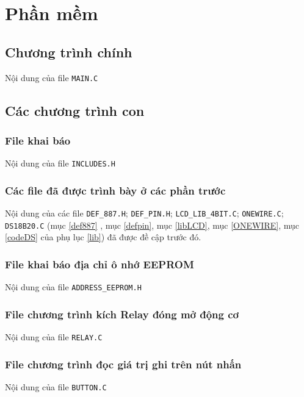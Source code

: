 \chapter{Phần mềm}
\section{Chương trình chính}
\hspace{.6cm}Nội dung của file \verb|MAIN.C|

\section{Các chương trình con}
\subsection{File khai báo}
\hspace{.6cm}Nội dung của file \verb|INCLUDES.H|

\subsection{Các file đã được trình bày ở các phần trước}
\hspace{.6cm}Nội dung của các file \verb|DEF_887.H|; \verb|DEF_PIN.H|; \verb|LCD_LIB_4BIT.C|; \verb|ONEWIRE.C|; \verb|DS18B20.C| (mục \ref{def887} , mục \ref{defpin}, mục \ref{libLCD}, mục \ref{ONEWIRE}, mục \ref{codeDS} của phụ lục \ref{lib}) đã được đề cập trước đó.
\subsection{File khai báo địa chỉ ô nhớ EEPROM}
\hspace{.6cm}Nội dung của file \verb|ADDRESS_EEPROM.H|

\subsection{File chương trình kích Relay đóng mở động cơ}
\hspace{.6cm}Nội dung của file \verb|RELAY.C|

\subsection{File chương trình đọc giá trị ghi trên nút nhấn}
\hspace{.6cm}Nội dung của file \verb|BUTTON.C|

